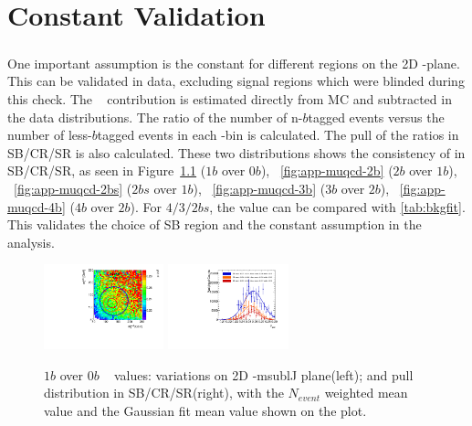 \chapter{Constant \muqcd Validation}
\label{AppendixSB}

\paragraph{}
One important assumption is the constant \muqcd for different regions on the 2D \mleadJ-\msublJ plane. 
This can be validated in data, excluding signal regions which were blinded during this check. 
The \ttbar~ contribution is estimated directly from MC and subtracted in the data distributions. 
The ratio of the number of n-$b$tagged events versus the number of less-$b$tagged events in each \mleadJ-\msublJ bin is calculated.
The pull of the ratios in SB/CR/SR is also calculated.
These two distributions shows the consistency of \muqcd in SB/CR/SR, as seen in Figure~\ref{fig:app-muqcd-1b} ($1b$ over $0b$), ~\ref{fig:app-muqcd-2b} ($2b$ over $1b$), ~\ref{fig:app-muqcd-2bs} ($2bs$ over $1b$), ~\ref{fig:app-muqcd-3b} ($3b$ over $2b$), ~\ref{fig:app-muqcd-4b} ($4b$ over $2b$). For $4/3/2bs$, the \muqcd value can be compared with \ref{tab:bkgfit}. 
This validates the choice of SB region and the constant \muqcd assumption in the analysis.

\begin{figure}[htbp!]
\begin{center}
\includegraphics[width=0.31\textwidth,angle=-90]{figures/boosted/AppendixMuqcdstudy/OneTag_Incl_mH0H1.pdf}
\includegraphics[width=0.31\textwidth,angle=-90]{figures/boosted/AppendixMuqcdstudy/OneTag_Incl_mH0H1_pull.pdf}
\caption{$1b$ over 0$b$ \muqcd~ values: \muqcd variations on 2D \mleadJ-msublJ plane(left); and \muqcd pull distribution in SB/CR/SR(right), with the $N_{event}$ weighted mean value and the Gaussian fit mean value shown on the plot.}
\label{fig:app-muqcd-1b}
\end{center}
\end{figure}

